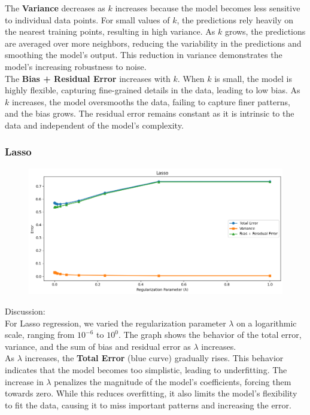\documentclass[a4paper,10pt]{article}
\begin{document}
The \textbf{Variance} decreases as \(k\) increases because the model becomes less sensitive to individual data points. For small values of \(k\), the predictions rely heavily on the nearest training points, resulting in high variance. As \(k\) grows, the predictions are averaged over more neighbors, reducing the variability in the predictions and smoothing the model's output. This reduction in variance demonstrates the model's increasing robustness to noise.\\ 

The \textbf{Bias + Residual Error} increases with \(k\). When \(k\) is small, the model is highly flexible, capturing fine-grained details in the data, leading to low bias. As \(k\) increases, the model oversmooths the data, failing to capture finer patterns, and the bias grows. The residual error remains constant as it is intrinsic to the data and independent of the model's complexity.\\ 


\subsubsection{Lasso}

\begin{figure}[H]
    \centering
    \includegraphics[width=1\linewidth]{bbbb.png}
\end{figure}

Discussion:\\

For Lasso regression, we varied the regularization parameter \(\lambda\) on a logarithmic scale, ranging from \(10^{-6}\) to \(10^0\). The graph shows the behavior of the total error, variance, and the sum of bias and residual error as \(\lambda\) increases.\\

As \(\lambda\) increases, the \textbf{Total Error} (blue curve) gradually rises. This behavior indicates that the model becomes too simplistic, leading to underfitting. The increase in \(\lambda\) penalizes the magnitude of the model’s coefficients, forcing them towards zero. While this reduces overfitting, it also limits the model’s flexibility to fit the data, causing it to miss important patterns and increasing the error.\\
\end{document}
